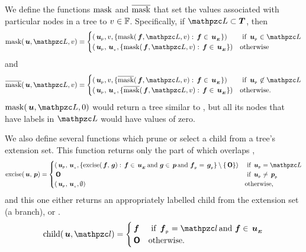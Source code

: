 \begin{definition}
  \label{mask}
  We define the functions $\operatorname{mask}$ and $\operatorname{\overline{mask}}$ that set the values
  associated with particular nodes in a tree to $v\in\mathbb{F}$.  Specifically,
  if $\mc{L} \subset \SDOM$, then
  \begin{equation}
    \mask(\node{u},\mc{L},v) = \begin{cases}
     (\nlabel{u}, v, \{\mask(\node{f},\mc{L},v):  \node{f}\in\extn{u}\}) & \text{ if } \nlabel{u} \in \mc{L} \\
      (\nlabel{u}, \nv{u}, \{\mask(\node{f},\mc{L},v): \node{f}\in\extn{u}\}) & \text{otherwise}
    \end{cases}
  \end{equation}
  and
  \begin{equation}
    \nmask(\node{u},\mc{L},v) = \begin{cases}
     (\nlabel{u}, v, \{\nmask(\node{f},\mc{L},v):  \node{f}\in\extn{u}\}) & \text{ if } \nlabel{u} \not\in \mc{L} \\
     (\nlabel{u}, \nv{u}, \{\nmask(\node{f},\mc{L},v): \node{f}\in\extn{u}\}) & \text{otherwise.}
    \end{cases}
  \end{equation}
  $\mask(\node{u},\mc{L},0)$ would return a tree similar to ,
  but all its nodes that have labels in $\mc{L}$ would have values of zero.

  We also define several functions which prune or select a child from
  a tree's extension set. This function returns only the part of
   which overlaps ,
  \begin{equation}
    \excise(\node{u},\node{p}) = \begin{cases}
      (\nlabel{u}, \nv{u}, \{\excise(\node{f},\node{g}): \node{f}\in\extn{u} \mand \node{g}\in\node{p} \mand \nlabel{f} = \nlabel{g}\} \setminus \{\nulltree\}) & \text{ if } \nlabel{u} = \mc{L} \\
      \nulltree & \text{ if }  \nlabel{u} \neq \nlabel{p} \\
      (\nlabel{u}, \nv{u}, \emptyset) & \text{otherwise,}
    \end{cases}
  \end{equation}
  and this one either returns an appropriately labelled child from the extension set (a
  branch), or \tnulltree.
  \begin{equation}
    \child(\node{u}, \mc{l}) = \begin{cases}
      \node{f} & \text{ if } \nlabel{f} = \mc{l} \mand \node{f} \in  \extn{u} \\
      \nulltree & \text{otherwise.}
    \end{cases}
  \end{equation}


\end{definition}
